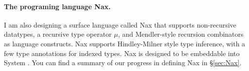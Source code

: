 \paragraph{The programing language Nax.}
I am also designing a surface language called Nax that supports
non-recursive datatypes, a recursive type operator $\mu$, and
Mendler-style recursion combinators as language constructs.
Nax supports Hindley-Milner style type inference, with a few type annotations
for indexed types. Nax is designed to be embeddable into System \Fi.
You can find a summary of our progress in defining Nax in \S\ref{sec:Nax}.

